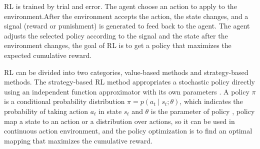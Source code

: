 \documentclass[journal]{IEEEtran}
\begin{document}
RL is trained by trial and error. The agent choose an action to apply to the environment.After the environment accepts the action, the state changes, and a signal (reward or punishment) is generated to feed back to the agent. The agent adjusts the selected policy according to the signal and the state after the environment changes, the goal of RL is to get a policy that maximizes the expected cumulative reward.
% 

RL can be divided into two categories, value-based methods and strategy-based methods.
The strategy-based RL method appropriates a stochastic policy directly using an independent function approximator with its own parameters \cite{sutton1999policy}.
A policy $\pi$ is a conditional probability distribution $\pi = p(a_t \mid s_t; \theta)$, which indicates the probability of taking action $a_t$ in state $s_t$ and $\theta$ is the parameter of policy \cite{sun2021learning}, policy map a state to an action or a distribution over actions, so it can be used in continuous action environment, and the policy optimization is to find an optimal mapping that maximizes the cumulative reward.
\end{document}
